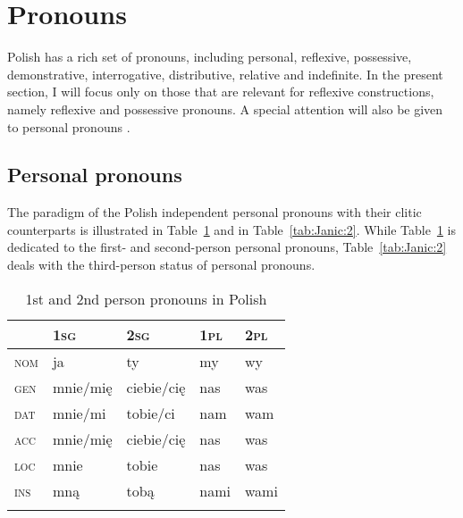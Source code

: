\documentclass[output=paper]{langscibook}
\begin{document}
\section{Pronouns} \label{sec:Janic:2}

Polish has a rich set of pronouns, including personal, reflexive, possessive, demonstrative, interrogative, distributive, relative and indefinite. In the present section, I will focus only on those that are relevant for reflexive constructions, namely reflexive  and possessive  pronouns. A special attention will also be given to personal pronouns . 



\subsection{Personal pronouns} \label{sec:Janic:2.1}

The paradigm of the Polish independent personal pronouns with their clitic counterparts is illustrated in Table~\ref{tab:Janic:1} and in Table~\ref{tab:Janic:2}. While Table~\ref{tab:Janic:1} is dedicated to the first- and second-person personal pronouns, Table~\ref{tab:Janic:2} deals with the third-person status of personal pronouns.

\begin{table}%
 \centering
 \begin{tabularx}{\textwidth}{p{2cm}p{2cm}p{2cm}p{2cm}p{2cm}}
 \lsptoprule
 & \textsc{1sg} & \textsc{2sg} & \textsc{1pl} & \textsc{2pl} \\
 \midrule
 \textsc{nom} & ja & ty & my & wy\\
 \textsc{gen} & mnie/mię & ciebie/cię & nas & was\\
 \textsc{dat} & mnie/mi	& tobie/ci	& nam & wam\\
 \textsc{acc} & mnie/mię	& ciebie/cię &	nas	& was\\
 \textsc{loc} & mnie	 & tobie	 & nas & was\\
 \textsc{ins} & mną	 & tobą	 & nami	& wami\\
 \lspbottomrule
 \end{tabularx}
 \caption{1st and 2nd person pronouns in Polish}
 \label{tab:Janic:1}
\end{table}
\end{document}
